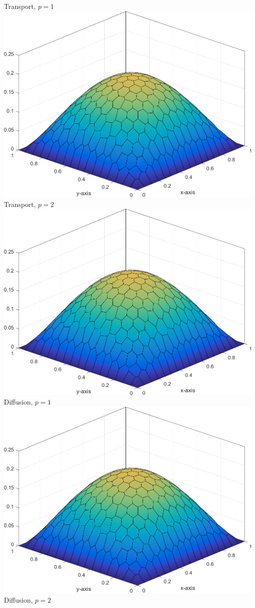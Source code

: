 \documentclass[compress,10pt]{beamer}
\begin{document}
\begin{frame}[t]
{\begin{columns}
Transport, $p=1$
{}\includegraphics[width=0.75\columnwidth]{images/Sq_poly_MAXENT_k=2_ep=1e-5.png}\\
Transport, $p=2$
\centering
{}\includegraphics[width=0.75\columnwidth]{images/Sq_poly_MAXENT_k=1.png}\\
Diffusion, $p=1$
{}\includegraphics[width=0.75\columnwidth]{images/Sq_poly_MAXENT_k=2.png}\\
Diffusion, $p=2$

\end{columns}}
\end{frame}
\end{document}
